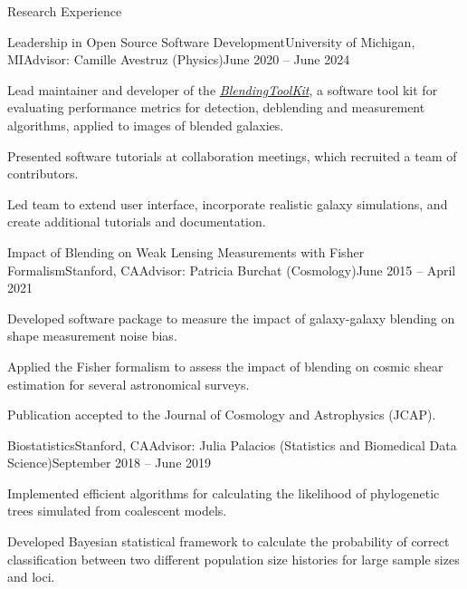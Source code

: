 \documentclass{resume} %
\begin{document}
\begin{rSection}{Research Experience}
\begin{rSubsection}{Leadership in Open Source Software Development}{University of Michigan, MI}{Advisor: Camille Avestruz (Physics)}{June 2020 -- June 2024}
\item Lead maintainer and developer of the \textit{\href{https://github.com/LSSTDESC/BlendingToolKit}{BlendingToolKit}}, a software tool kit for evaluating performance metrics for detection, deblending and measurement algorithms, applied to images of blended galaxies.
\item Presented software tutorials at collaboration meetings, which recruited a team of contributors.
\item Led team to extend user interface, incorporate realistic galaxy simulations, and create additional tutorials and documentation.
\end{rSubsection}

\begin{rSubsection}{Impact of Blending on Weak Lensing Measurements with Fisher Formalism}{Stanford, CA}{Advisor: Patricia Burchat (Cosmology)}{June 2015 -- April 2021}
\item Developed software package to measure the impact of galaxy-galaxy blending on shape measurement noise bias.
\item Applied the Fisher formalism to assess the impact of blending on cosmic shear estimation for several astronomical surveys.
\item Publication accepted to the Journal of Cosmology and Astrophysics (JCAP). 
\end{rSubsection}

\begin{rSubsection}{Biostatistics}{Stanford, CA}{Advisor: Julia Palacios (Statistics and Biomedical Data Science)}{September 2018 -- June 2019}
\item Implemented efficient algorithms for calculating the likelihood of phylogenetic trees simulated from coalescent models.

\item Developed Bayesian statistical framework to calculate the probability of correct classification between two different population size histories for large sample sizes and loci. 


\end{rSubsection}


\end{rSection}
\end{document}

